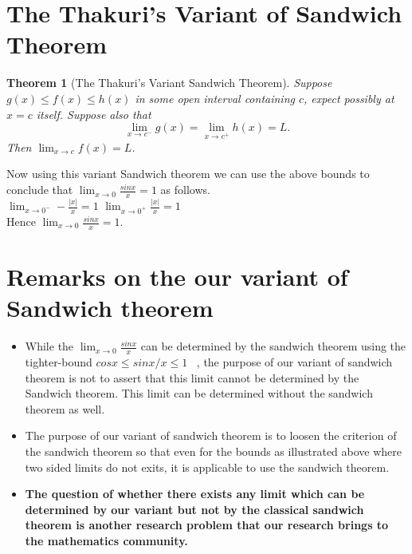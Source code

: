 \documentclass[a4paper,twoside,12pt]{article}
\theoremstyle{plain}
\newtheorem{theorem}{Theorem}[section]
\theoremstyle{definition}
\begin{document}
\section{The Thakuri's Variant of Sandwich Theorem}
\begin{theorem}[The Thakuri's Variant Sandwich Theorem]
Suppose $g(x) \leq f(x) \leq h(x)$ in some open interval containing $c$, expect possibly at $x=c$ itself. Suppose also that $$\lim_{x \to c^-} g(x) = \lim_{x \to c^+} h(x) =L  .$$ Then $\displaystyle \lim_{x \to c} f(x)=L$.
\end{theorem}

Now using this variant Sandwich theorem we can use the above bounds to conclude that \(\displaystyle \lim_{x \to 0} \frac{sinx}{x}=1\) as follows. \\[2mm]
 \(\displaystyle \lim_{x \to 0^-} -\frac{|x|}{x}=1\) \hspace{7cm}
 \(\displaystyle \lim_{x \to 0^+} \frac{|x|}{x}=1\) \\[3mm]

 Hence \(\displaystyle \lim_{x \to 0} \frac{sinx}{x}=1\).

 \section{Remarks on the our variant of Sandwich theorem}
 \begin{itemize}
 \item  While the \(\displaystyle \lim_{x \to 0} \frac{sinx}{x}\) can be determined by the sandwich theorem using the tighter-bound $cosx \leq sinx/x \leq 1$ ~\cite{tao}, the purpose of our variant of sandwich theorem is not to assert that this limit cannot be determined by the Sandwich theorem. This limit can be determined without the sandwich theorem as well.

 \item The purpose of our variant of sandwich theorem is to loosen the criterion of the sandwich theorem so that even for the bounds as illustrated above where two sided limits do not exits, it is applicable to use the sandwich theorem.

\item \textbf{The question of whether there exists any limit which can be determined by our variant but not by the classical sandwich theorem is another research problem that our research brings to the mathematics community.}
 \end{itemize}

\vspace{5mm}
\end{document}
